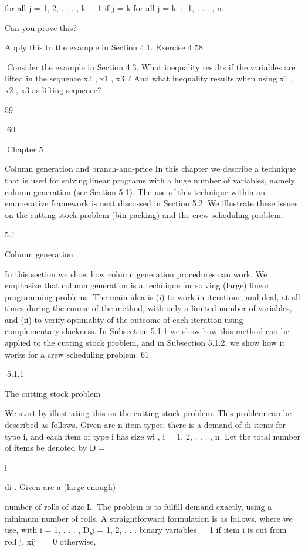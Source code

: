 \documentclass[titlepage]{book}
\theoremstyle{plain}
\theoremstyle{definition}
\theoremstyle{remark}
\begin{document}
for all j = 1, 2, . . . , k − 1
if j = k
for all j = k + 1, . . . , n.

Can you prove this?

Apply this to the example in Section 4.1.
Exercise 4
58

Consider the example in Section 4.3. What inequality results if the variables are lifted in the sequence
x2 , x1 , x3 ? And what inequality results when using x1 , x2 , x3 as lifting sequence?

59

60

Chapter 5

Column generation and
branch-and-price
In this chapter we describe a technique that is used for solving linear programs with a huge number of
variables, namely column generation (see Section 5.1). The use of this technique within an enumerative
framework is next discussed in Section 5.2. We illustrate these issues on the cutting stock problem (bin
packing) and the crew scheduling problem.

5.1

Column generation

In this section we show how column generation procedures can work. We emphasize that column generation is a technique for solving (large) linear programming problems. The main idea is (i) to work in
iterations, and deal, at all times during the course of the method, with only a limited number of variables,
and (ii) to verify optimality of the outcome of each iteration using complementary slackness. In Subsection 5.1.1 we show how this method can be applied to the cutting stock problem, and in Subsection 5.1.2,
we show how it works for a crew scheduling problem.
61

5.1.1

The cutting stock problem

We start by illustrating this on the cutting stock problem. This problem can be described as follows.
Given are n item types; there is a demand of di items for type i, and each item of type i has size wi ,
i = 1, 2, . . . , n. Let the total number of items be denoted by D =

i

di . Given are a (large enough)

number of rolls of size L. The problem is to fulfill demand exactly, using a minimum number of rolls. A
straightforward formulation is as follows, where we use, with i = 1, . . . , D,j = 1, 2, . . . binary variables

 1 if item i is cut from roll j,
xij =
 0 otherwise,
\end{document}
